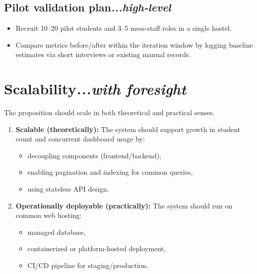 \documentclass[12pt,a4paper]{article}
\newcommand{\secann}[1]{\hfill\normalfont\itshape #1}
\begin{document}
\subsection{Pilot validation plan\secann{...high-level}}

\begin{itemize}
    \item Recruit 10--20 pilot students and 3--5 mess-staff roles in a single
    hostel.
    \item Compare metrics before/after within the iteration window by logging
    baseline estimates via short interviews or existing manual records.
\end{itemize}

\section{Scalability\secann{...with foresight}}

The proposition should scale in both theoretical and practical senses.

\begin{enumerate}
    \item \textbf{Scalable (theoretically):} The system should support
    growth in student count and concurrent dashboard usage by:
    \begin{itemize}
        \item decoupling components (frontend/backend),
        \item enabling pagination and indexing for common queries,
        \item using stateless API design.
    \end{itemize}
    \item \textbf{Operationally deployable (practically):} The system should
    run on common web hosting:
    \begin{itemize}
        \item managed database,
        \item containerized or platform-hosted deployment,
        \item CI/CD pipeline for staging/production.
    \end{itemize}
\end{enumerate}

\end{document}
